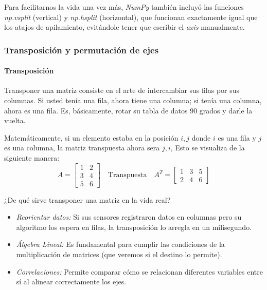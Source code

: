 \begin{nota}
Para facilitarnos la vida una vez más, \textit{NumPy} también incluyó las funciones \textit{np.vsplit} (vertical) y \textit{np.hsplit} (horizontal), que funcionan exactamente igual que los atajos de apilamiento, evitándole tener que escribir el \textit{axis} manualmente.
\end{nota}



\subsubsection{Transposición y permutación de ejes}

\paragraph{Transposición}

Transponer una matriz consiste en el arte de intercambiar sus filas por sus columnas. Si usted tenía una fila, ahora tiene una columna; si tenía una columna, ahora es una fila. Es, básicamente, rotar su tabla de datos 90 grados y darle la vuelta.

Matemáticamente, si un elemento estaba en la posición \(i,j\) donde \(i\) es una fila y \(j\) es una columna, la matriz transpuesta ahora sera \(j,i\), Esto se visualiza de la siguiente manera:
\[
A = \begin{bmatrix}
    1 & 2 \\
    3 & 4 \\
    5 & 6
\end{bmatrix}
\quad
\text{Transpuesta}
\quad
A^T= \begin{bmatrix}
    1 & 3 & 5 \\
    2 & 4 & 6
\end{bmatrix}
\]

¿De qué sirve transponer una matriz en la vida real?
\begin{itemize}
\item \textit{Reorientar datos:} Si sus sensores registraron datos en columnas pero su algoritmo los espera en filas, la transposición lo arregla en un milisegundo.
\item \textit{Álgebra Lineal:} Es fundamental para cumplir las condiciones de la multiplicación de matrices (que veremos si el destino lo permite).
\item \textit{Correlaciones:} Permite comparar cómo se relacionan diferentes variables entre sí al alinear correctamente los ejes.
\end{itemize}


